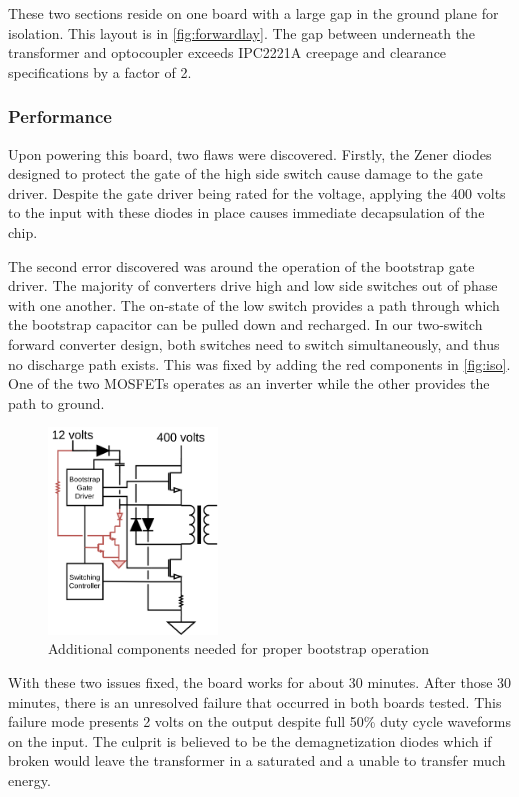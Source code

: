 \documentclass[15pt]{article}
\begin{document}
These two sections reside on one board with a large gap in the ground plane for isolation. This layout is in \autoref{fig:forwardlay}. The gap between underneath the transformer and optocoupler exceeds IPC2221A\cite{6} creepage and clearance specifications by a factor of 2.

\subsubsection{Performance}
\label{sec:isoperformance}
Upon powering this board, two flaws were discovered. Firstly, the Zener diodes designed to protect the gate of the high side switch cause damage to the gate driver. Despite the gate driver being rated for the voltage, applying the 400 volts to the input with these diodes in place causes immediate decapsulation of the chip. 

The second error discovered was around the operation of the bootstrap gate driver. The majority of converters drive high and low side switches out of phase with one another. The on-state of the low switch provides a path through which the bootstrap capacitor can be pulled down and recharged. In our two-switch forward converter design, both switches need to switch simultaneously, and thus no discharge path exists. This was fixed by adding the red components in \autoref{fig:iso}. One of the two MOSFETs operates as an inverter while the other provides the path to ground.

\begin{figure}[H]
    \begin{center}
    \includegraphics[width=0.4\textwidth]{iso}
    \end{center}
    \caption{Additional components needed for proper bootstrap operation}
    \label{fig:iso}
\end{figure}

With these two issues fixed, the board works for about 30 minutes. After those 30 minutes, there is an unresolved failure that occurred in both boards tested. This failure mode presents 2 volts on the output despite full 50\% duty cycle waveforms on the input. The culprit is believed to be the demagnetization diodes which if broken would leave the transformer in a saturated and a unable to transfer much energy. 
\end{document}

